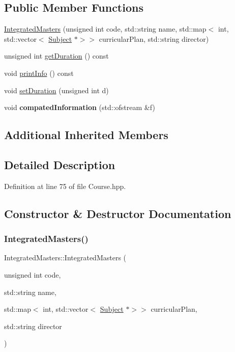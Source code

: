 \subsection*{Public Member Functions}
\begin{DoxyCompactItemize}
\item 
\hyperlink{classIntegratedMasters_abb56fa7208cf3bb9ea74198c074e2dc8}{Integrated\+Masters} (unsigned int code, std\+::string name, std\+::map$<$ int, std\+::vector$<$ \hyperlink{classSubject}{Subject} $\ast$$>$$>$ curricular\+Plan, std\+::string director)
\item 
unsigned int \hyperlink{classIntegratedMasters_a8a126eac588aa68ed2895b589d34a7ed}{get\+Duration} () const
\item 
void \hyperlink{classIntegratedMasters_a71d4f5089e42207af1106604e316f155}{print\+Info} () const
\item 
void \hyperlink{classIntegratedMasters_a7be9fb139aef4a5b839bb6879de8cddb}{set\+Duration} (unsigned int d)
\item 
\mbox{\label{classIntegratedMasters_aadff7d568166626c4fe151320399e643}} 
void {\bfseries compated\+Information} (std\+::ofstream \&f)
\end{DoxyCompactItemize}
\subsection*{Additional Inherited Members}


\subsection{Detailed Description}


Definition at line 75 of file Course.\+hpp.



\subsection{Constructor \& Destructor Documentation}
\mbox{\label{classIntegratedMasters_abb56fa7208cf3bb9ea74198c074e2dc8}} 
\subsubsection{\texorpdfstring{Integrated\+Masters()}{IntegratedMasters()}}
{\footnotesize\ttfamily Integrated\+Masters\+::\+Integrated\+Masters (\begin{DoxyParamCaption}\item[{unsigned int}]{code,  }\item[{std\+::string}]{name,  }\item[{std\+::map$<$ int, std\+::vector$<$ \hyperlink{classSubject}{Subject} $\ast$$>$$>$}]{curricular\+Plan,  }\item[{std\+::string}]{director }\end{DoxyParamCaption})}

